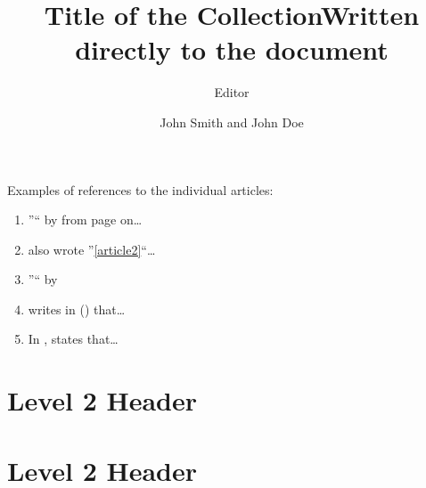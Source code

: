 \documentclass[articlecollection]{aaltoseries}
\author{Editor}
\title{Title of the Collection}
\begin{document}
\draftabstract{\lipsum[1-3]}

\begin{preface}%
\lipsum[1-4]
\end{preface}

\vskip22pt
\noindent Examples of references to the individual articles:
\begin{enumerate}
\item ''`` by  from page \pageref{article1} on\ldots
\item {} also wrote ''\ref{article2}``\ldots
\item ''`` by 
\item {} writes in  () that\ldots
\item In ,  states that\ldots
\end{enumerate}

\tableofcontents

\author[John Smith and John Doe]{John Smith and John Doe}
\title{Written directly to the document}

\maketitle[article1]

\begin{abstract}
\lipsum[1]
\end{abstract}

\section{Level 2 Header}
\lipsum[1-2]

\section{Level 2 Header}
\lipsum[3-4]
\end{document}
